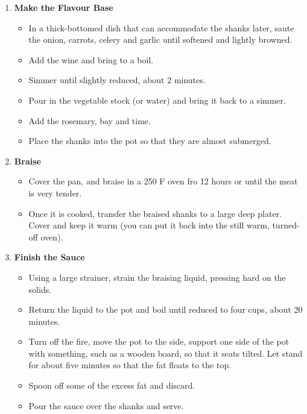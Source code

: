 \documentclass[11pt,letterpaper]{article}
\begin{document}
\begin{description}
\begin{enumerate}
	\item {\bf Make the Flavour Base}
	\begin{itemize}
	\item In a thick-bottomed dish that can accommodate the shanks later, saute the onion, carrots, celery and garlic until softened and lightly browned.
	\item Add the wine and bring to a boil.
	\item Simmer until slightly reduced, about 2 minutes.
	\item Pour in the vegetable stock (or water) and bring it back to a simmer.
	\item Add the rosemary, bay and time.
	\item Place the shanks into the pot so that they are almost submerged. 
	\end{itemize}

	\item {\bf Braise}
	\begin{itemize}
	\item Cover the pan, and braise in a 250 F oven fro 12 hours or until the meat is very tender.
	\item Once it is cooked, transfer the braised shanks to a large deep plater. Cover and keep it warm (you can put it back into the still warm, turned-off oven).
	\end{itemize}

	\item {\bf Finish the Sauce}
	\begin{itemize}
	\item Using a large strainer, strain the braising liquid, pressing hard on the solids.
	\item Return the liquid to the pot and boil until reduced to four cups, about 20 minutes.
	\item Turn off the fire, move the pot to the side, support one side of the pot with something, such as a wooden board, so that it seats tilted. Let stand for about five minutes so that the fat floats to the top.
	\item Spoon off some of the excess fat and discard.
	\item Pour the sauce over the shanks and serve.
	\end{itemize}

	\end{enumerate}
\end{description}
\end{document}
